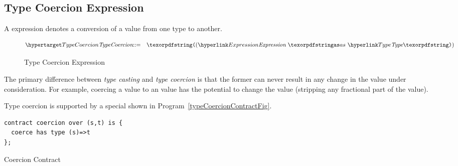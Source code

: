 %
%
%
\subsection{Type Coercion Expression}
\label{typeCoercionExpression}
\label{typeCoercionContract}
A  expression denotes a conversion of a value from one type to another. 

\begin{figure}[htbp]
\begin{eqnarray*}
\ntDef{TypeCoercion}&\arrow&\q{(}\ntRef{Expression}\ \q{as}\ \ntRef{Type}\q{)}
\end{eqnarray*}
\caption{Type Coercion Expression}
\label{typeCoercionExpressionFig}
\end{figure}

The primary difference between \emph{type casting} and \emph{type coercion} is that the former can never result in any change in the value under consideration. For example, coercing a  value to an  value has the potential to change the value (stripping any fractional part of the value).

Type coercion is supported by a special   shown in Program~\vref{typeCoercionContractFig}.

\begin{program}
\begin{lstlisting}
contract coercion over (s,t) is {
  coerce has type (s)=>t
};
\end{lstlisting}
\label{typeCoercionContractFig}
\caption{Coercion Contract }
\end{program}


